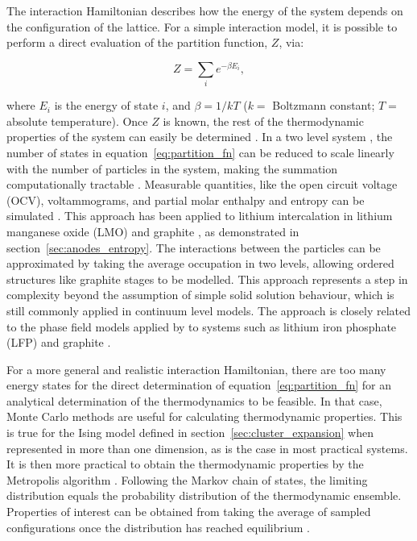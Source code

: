 \documentclass[../main.tex]{subfiles}
\begin{document}
The interaction Hamiltonian describes how the energy of the system depends on the configuration of the lattice. For a simple interaction model, it is possible to perform a direct evaluation of the partition function, $Z$, via:
    
\begin{equation}
        Z = \sum_{i}e^{-\beta E_{i}},
        \label{eq:partition_fn}
\end{equation}

where $E_{i}$ is the energy of state $i$, and $\beta = 1/kT$ ($k =$ Boltzmann constant; $T=$ absolute temperature). Once $Z$ is known, the rest of the thermodynamic properties of the system can easily be determined \cite{Mercer2019,Leiva2017b,schlueter_quantifying_2018}. In a two level system \cite{Leiva2017b}, the number of states in equation~\ref{eq:partition_fn} can be reduced to scale linearly with the number of particles in the system, making the summation computationally tractable \cite{Mercer2019,Leiva2017b,schlueter_quantifying_2018}. Measurable quantities, like the open circuit voltage (OCV), voltammograms, and partial molar enthalpy and entropy can be simulated \cite{schlueter_quantifying_2018,Leiva2017b,Mercer2019}. This approach has been applied to lithium intercalation in lithium manganese oxide (LMO) \cite{schlueter_quantifying_2018} and graphite \cite{Mercer2019,Leiva2017b}, as demonstrated in section~\ref{sec:anodes_entropy}. The interactions between the particles can be approximated by taking the average occupation in two levels, allowing ordered structures like graphite stages to be modelled. This approach represents a step in complexity beyond the assumption of simple solid solution behaviour, which is still commonly applied in continuum level models. \citeauthor{HAFTBARADARAN2011361} The approach is closely related to the phase field models applied by \citeauthor{Bazant2017} to systems such as lithium iron phosphate (LFP) and graphite \cite{Bazant2017,guo2016,peng2011}.

For a more general and realistic interaction Hamiltonian, there are too many energy states for the direct determination of equation~\ref{eq:partition_fn} for an analytical determination of the thermodynamics to be feasible. In that case, Monte Carlo methods are useful for calculating thermodynamic properties. This is true for the Ising model defined in section~\ref{sec:cluster_expansion} when represented in more than one dimension, as is the case in most practical systems.  It is then more practical to obtain the thermodynamic properties by the Metropolis algorithm \cite{Metropolis1953}. Following the Markov chain of states, the limiting distribution equals the probability distribution of the thermodynamic ensemble. Properties of interest can be obtained from taking the average of sampled configurations once the distribution has reached equilibrium \cite{oviedo2015underpotential}.
\end{document}
